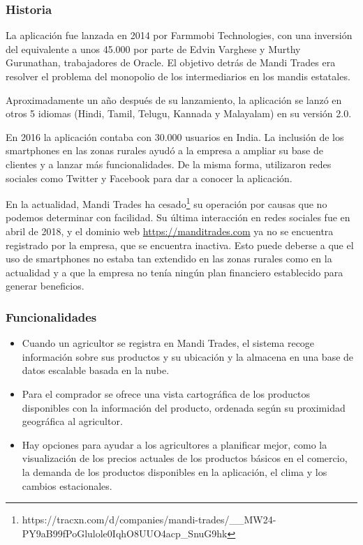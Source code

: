 \subsubsection{Historia}

La aplicación fue lanzada en 2014 por Farmmobi Technologies, con una inversión del equivalente a unos 45.000\geneuro{}  por parte de Edvin Varghese y Murthy Gurunathan, trabajadores de Oracle. El objetivo detrás de Mandi Trades era resolver el problema del monopolio de los intermediarios en los mandis estatales.

Aproximadamente un año después de su lanzamiento, la aplicación se lanzó en otros 5 idiomas (Hindi, Tamil, Telugu, Kannada y Malayalam) en su versión 2.0.

En 2016 la aplicación contaba con 30.000 usuarios en India. La inclusión de los smartphones en las zonas rurales ayudó a la empresa a ampliar su base de clientes y a lanzar más funcionalidades. De la misma forma, utilizaron redes sociales como Twitter y Facebook para dar a conocer la aplicación.

En la actualidad, Mandi Trades ha cesado\footnote{https://tracxn.com/d/companies/mandi-trades/__MW24-PY9aB99fPoGlulole0IqhO8UUO4acp_SnuG9hk} su operación por causas que no podemos determinar con facilidad. Su última interacción en redes sociales fue en abril de 2018, y el dominio web \url{https://manditrades.com} ya no se encuentra registrado por la empresa, que se encuentra inactiva. Esto puede deberse a que el uso de smartphones no estaba tan extendido en las zonas rurales como en la actualidad y a que la empresa no tenía ningún plan financiero establecido para generar beneficios.

\subsubsection{Funcionalidades}

\begin{itemize}

	\item Cuando un agricultor se registra en Mandi Trades, el sistema recoge información sobre sus productos y su ubicación y la almacena en una base de datos escalable basada en la nube.
	
	\item Para el comprador se ofrece una vista cartográfica de los productos disponibles con la información del producto, ordenada según su proximidad geográfica al agricultor.

	\item Hay opciones para ayudar a los agricultores a planificar mejor, como la visualización de los precios actuales de los productos básicos en el comercio, la demanda de los productos disponibles en la aplicación, el clima y los cambios estacionales.

\end{itemize}

